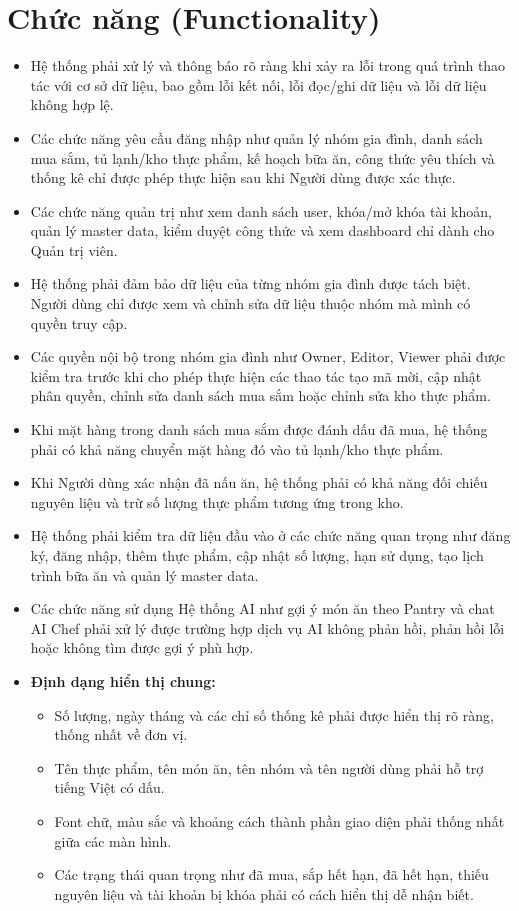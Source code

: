 \section{Chức năng (Functionality)}
\begin{itemize}
    \item Hệ thống phải xử lý và thông báo rõ ràng khi xảy ra lỗi trong quá trình thao tác với cơ sở dữ liệu, bao gồm lỗi kết nối, lỗi đọc/ghi dữ liệu và lỗi dữ liệu không hợp lệ.
    \item Các chức năng yêu cầu đăng nhập như quản lý nhóm gia đình, danh sách mua sắm, tủ lạnh/kho thực phẩm, kế hoạch bữa ăn, công thức yêu thích và thống kê chỉ được phép thực hiện sau khi Người dùng được xác thực.
    \item Các chức năng quản trị như xem danh sách user, khóa/mở khóa tài khoản, quản lý master data, kiểm duyệt công thức và xem dashboard chỉ dành cho Quản trị viên.
    \item Hệ thống phải đảm bảo dữ liệu của từng nhóm gia đình được tách biệt. Người dùng chỉ được xem và chỉnh sửa dữ liệu thuộc nhóm mà mình có quyền truy cập.
    \item Các quyền nội bộ trong nhóm gia đình như Owner, Editor, Viewer phải được kiểm tra trước khi cho phép thực hiện các thao tác tạo mã mời, cập nhật phân quyền, chỉnh sửa danh sách mua sắm hoặc chỉnh sửa kho thực phẩm.
    \item Khi mặt hàng trong danh sách mua sắm được đánh dấu đã mua, hệ thống phải có khả năng chuyển mặt hàng đó vào tủ lạnh/kho thực phẩm.
    \item Khi Người dùng xác nhận đã nấu ăn, hệ thống phải có khả năng đối chiếu nguyên liệu và trừ số lượng thực phẩm tương ứng trong kho.
    \item Hệ thống phải kiểm tra dữ liệu đầu vào ở các chức năng quan trọng như đăng ký, đăng nhập, thêm thực phẩm, cập nhật số lượng, hạn sử dụng, tạo lịch trình bữa ăn và quản lý master data.
    \item Các chức năng sử dụng Hệ thống AI như gợi ý món ăn theo Pantry và chat AI Chef phải xử lý được trường hợp dịch vụ AI không phản hồi, phản hồi lỗi hoặc không tìm được gợi ý phù hợp.
    \item \textbf{Định dạng hiển thị chung:}
    \begin{itemize}
        \item Số lượng, ngày tháng và các chỉ số thống kê phải được hiển thị rõ ràng, thống nhất về đơn vị.
        \item Tên thực phẩm, tên món ăn, tên nhóm và tên người dùng phải hỗ trợ tiếng Việt có dấu.
        \item Font chữ, màu sắc và khoảng cách thành phần giao diện phải thống nhất giữa các màn hình.
        \item Các trạng thái quan trọng như đã mua, sắp hết hạn, đã hết hạn, thiếu nguyên liệu và tài khoản bị khóa phải có cách hiển thị dễ nhận biết.
    \end{itemize}
\end{itemize}

